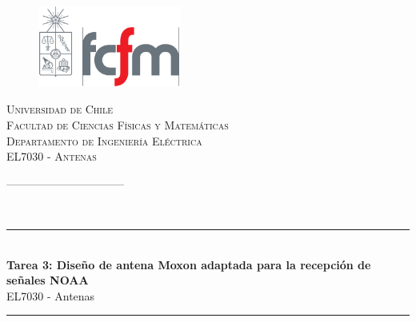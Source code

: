\documentclass[11pt,a4paper]{article}
\newcommand{\HRule}{\rule{\linewidth}{.4mm}}
\begin{document}
\renewcommand{\tablename}{Tabla}


\begin{titlepage}

{
\begin{figure}
\vspace{-.7cm}
\includegraphics[width=4.7cm]{img/fcfm}
\end{figure}
\textsc{\color{red}\hspace{3cm}Universidad de Chile}\\
\textsc{\color{gray}\hspace{3.6cm}Facultad de Ciencias Físicas y Matemáticas}\\
\textsc{\color{gray}\hspace{3.6 cm}Departamento de Ingeniería Eléctrica}\\
\textsc{\color{gray}\hspace{3.6cm}\small EL7030 - Antenas}\\
}
    
--------------------------------
        \begin{center}
        ~\\[3.5cm]
        \HRule~ \\[0.4cm]
        { \Huge \textup \bfseries  Tarea 3: Diseño de antena Moxon adaptada para la recepción de señales NOAA}\\[0.4cm]
        { \Large \textup{EL7030 - Antenas}}\\[0.2cm]
        \HRule ~\\[2cm]
        \end{center}
        \begin{minipage}{.5\textwidth}
       

\end{minipage}
\end{titlepage}
\end{document}
